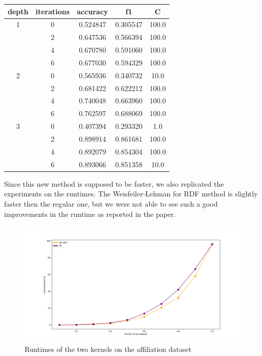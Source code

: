 \documentclass[12pt]{scrartcl}
\begin{document}
\begin{center}
\begin{tabular}{ccccc}
\toprule
depth & iterations & accuracy & f1 & C \\
\midrule
1 & 0 &  0.524847 &  0.305547 &  100.0 \\
  & 2 &  0.647536 &  0.566394 &  100.0 \\
  & 4 &  0.670780 &  0.591060 &  100.0 \\
  & 6 &  0.677030 &  0.594329 &  100.0 \\
\hline
2 & 0 &  0.565936 &  0.340732 &   10.0 \\
  & 2 &  0.681422 &  0.622212 &  100.0 \\
  & 4 &  0.740048 &  0.663960 &  100.0 \\
  & 6 &  0.762597 &  0.688069 &  100.0 \\
\hline
3 & 0 &  0.407394 &  0.293320 &    1.0 \\
  & 2 &  0.898914 &  0.861681 &  100.0 \\
  & 4 &  0.892079 &  0.854304 &  100.0 \\
  & 6 &  0.893066 &  0.851358 &   10.0 \\
\bottomrule
\end{tabular}
\end{center}

\newpage

Since this new method is supposed to be faster, we also replicated the experiments on the runtimes. The Weisfeiler-Lehman for RDF method is slightly faster then the regular one, but we were not able to see such a good improvements in the runtime as reported in the paper.

\begin{center}
\begin{figure}[h]
\caption{Runtimes of the two kernels on the affiliation dataset}
\includegraphics[width=\textwidth]{img/affiliation_timing.png}
\end{figure}
\end{center}
\end{document}
